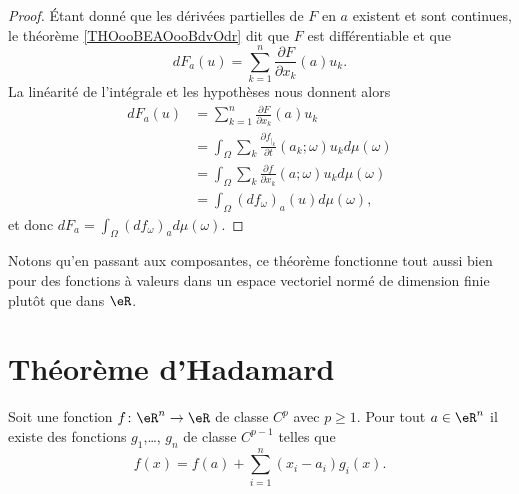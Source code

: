 \begin{proof}
	Étant donné que les dérivées partielles de \( F\) en \( a\) existent et sont continues, le théorème \ref{THOooBEAOooBdvOdr} dit que \( F\) est différentiable et que
	\begin{equation}
		dF_a(u)=\sum_{k=1}^n\frac{ \partial F }{ \partial x_k }(a)u_k.
	\end{equation}
	La linéarité de l'intégrale et les hypothèses nous donnent alors
	\begin{subequations}
		\begin{align}
			dF_a(u) & =\sum_{k=1}^n\frac{ \partial F }{ \partial x_k }(a)u_k                                 \\
			        & =\int_{\Omega}\sum_k\frac{ \partial f_{|_k} }{ \partial t }(a_k;\omega)u_kd\mu(\omega) \\
			        & =\int_{\Omega}\sum_k\frac{ \partial f }{ \partial x_k }(a;\omega)u_kd\mu(\omega)       \\
			        & =\int_{\Omega}(df_{\omega})_a(u)d\mu(\omega),
		\end{align}
	\end{subequations}
	et donc \( dF_a=\int_{\Omega}(df_{\omega})_ad\mu(\omega)\).
\end{proof}
Notons qu'en passant aux composantes, ce théorème fonctionne tout aussi bien pour des fonctions à valeurs dans un espace vectoriel normé de dimension finie plutôt que dans \( \eR\).


\section{Théorème d'Hadamard}


\begin{lemma}   \label{LemWNBooGPlIwT}
	Soit une fonction \( f\colon \eR^n\to \eR\) de classe \( C^p\) avec \( p\geq 1\). Pour tout \( a\in \eR^n\) il existe des fonctions \( g_1\),\ldots, \( g_n\) de classe \( C^{p-1}\) telles que
	\begin{equation}
		f(x)=f(a)+\sum_{i=1}^n(x_i-a_i)g_i(x).
	\end{equation}
\end{lemma}

